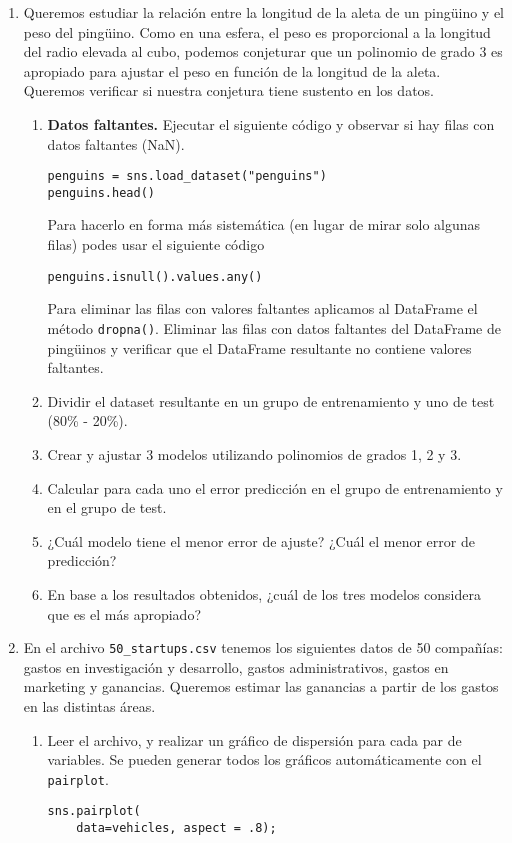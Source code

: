 \documentclass[a4paper,11pt]{article}
\theoremstyle{definition}
\begin{document}
\begin{enumerate}

\item Queremos estudiar la relación entre la longitud de la aleta de un ping\"uino y el peso del ping\"uino. Como en una esfera, el peso es proporcional a la longitud del radio elevada al cubo, podemos conjeturar que un polinomio de grado 3 es apropiado para ajustar el peso en función de la longitud de la aleta. Queremos verificar si nuestra conjetura tiene sustento en los datos.
\begin{enumerate}
\item \textbf{Datos faltantes.} Ejecutar el siguiente c\'odigo y observar si hay filas con datos faltantes (NaN).
\begin{lstlisting}
penguins = sns.load_dataset("penguins")
penguins.head()
\end{lstlisting}

Para hacerlo en forma más sistemática (en lugar de mirar solo algunas filas) podes usar el siguiente código
\begin{lstlisting}
penguins.isnull().values.any()
\end{lstlisting}

Para eliminar las filas con valores faltantes aplicamos al DataFrame el método \lstinline{dropna()}. Eliminar las filas con datos faltantes del DataFrame de ping\"uinos y verificar que el DataFrame resultante no contiene valores faltantes.

\item Dividir el dataset resultante  en un grupo de entrenamiento y uno de test (80\% - 20\%).
\item Crear y ajustar 3 modelos utilizando polinomios de grados 1, 2 y 3. 
\item Calcular para cada uno el error predicción en el grupo de entrenamiento y en el grupo de test.
\item ¿Cuál modelo tiene el menor error de ajuste? ¿Cuál el menor error de predicción?
\item En base a los resultados obtenidos, ¿cu\'al de los tres modelos considera que es el m\'as apropiado?
\end{enumerate}

\item En el archivo \lstinline{50_startups.csv} tenemos los siguientes datos de 50 compa\~n\'ias: gastos en investigación y desarrollo, gastos administrativos, gastos en marketing y ganancias. Queremos estimar las ganancias a partir de los gastos en las distintas áreas.
\begin{enumerate}
\item Leer el archivo, y realizar un gráfico de dispersión para cada par de variables. Se pueden generar todos los gráficos automáticamente con el \lstinline{pairplot}.
\begin{lstlisting}
sns.pairplot(
    data=vehicles, aspect = .8);
\end{lstlisting}


\end{enumerate}
\end{enumerate}
\end{document}
